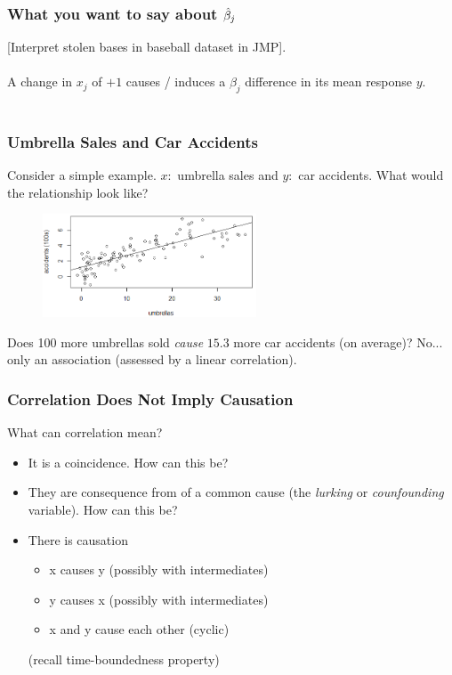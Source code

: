 \documentclass[handout]{beamer}
\begin{document}
\begin{frame}\frametitle{What you want to say about $\hat{\beta}_j$}

[Interpret stolen bases in baseball dataset in JMP].\\~\\

A change in $x_j$ of $+1$ causes / induces a $\beta_j$ difference in its mean response $y$.\\~\\

\end{frame}


\begin{frame}\frametitle{Umbrella Sales and Car Accidents}

Consider a simple example. $x:$ umbrella sales and $y:$ car accidents. What would the relationship look like? \pause

\begin{figure}
\centering
\includegraphics[width=2.5in]{umbrellas_car_accidents.png}
\end{figure}

Does 100 more umbrellas sold \textit{cause} $15.3$ more car accidents (on average)? \pause No... only an association (assessed by a linear correlation).

\end{frame}

\begin{frame}\frametitle{Correlation Does Not Imply Causation}

What can correlation mean?

\begin{itemize}
\item It is a coincidence. How can this be?
\item They are consequence from of a common cause (the \emph{lurking} or \emph{counfounding} variable). How can this be?
\item There is causation \pause
\begin{itemize}
\item x causes y (possibly with intermediates)
\item y causes x (possibly with intermediates)
\item x and y cause each other (cyclic)
\end{itemize}
(recall time-boundedness property)
\end{itemize}

\end{frame}
\end{document}
